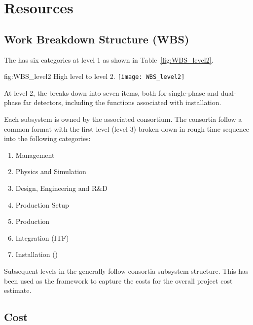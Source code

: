 \chapter{Resources}
\label{vl:tc-resources}


\section{Work Breakdown Structure (WBS)}
\label{sec:fdsp-coord-wbs}

The   has six categories at level 1 as shown in
Table~\ref{fig:WBS_level2}.  
\begin{dunefigure}{fig:WBS_level2}
  {High level   to level 2.}
  \texttt{[image: WBS\_level2]}
\end{dunefigure}
At level 2, the  breaks down into seven items, both
for single-phase and dual-phase far detectors, including the 
functions associated with installation.

Each subsystem  is owned by the associated consortium. The
consortia  follow a common format with the first level
(level 3) broken down in rough time sequence into the following
categories:
\begin{enumerate}
  \item Management
  \item Physics and Simulation
  \item Design, Engineering and R\&D
  \item Production Setup
  \item Production
  \item Integration (ITF)
  \item Installation (\surf)
\end{enumerate}
Subsequent levels in the  generally follow consortia subsystem structure.
This  has been used as the framework to capture the costs
for the overall  project cost estimate.

\section{Cost}
\label{sec:fdsp-coord-cost}


